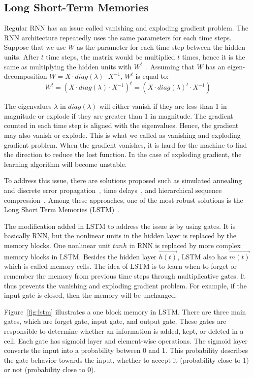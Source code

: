 \subsection{Long Short-Term Memories}
Regular RNN has an issue called vanishing and exploding gradient problem. The RNN architecture repeatedly uses the same parameters for each time steps. Suppose that we use $W$ as the parameter for each time step between the hidden units. After $t$ time steps, the matrix would be multiplied $t$ times, hence it is the same as multiplying the hidden units with $W^{t}$~\citep{Goodfellow-et-al-2016-Book}. Assuming that $W$ has an eigen-decomposition $W = X \cdot diag(\lambda) \cdot X^{-1}$, $W^{t}$ is equal to:
\begin{equation}
W^{t} = (X \cdot diag(\lambda) \cdot X^{-1})^{t} = (X \cdot diag(\lambda)^{t} \cdot X^{-1})
\end{equation}

The eigenvalues $\lambda$ in $diag(\lambda)$ will either vanish if they are less than 1 in magnitude or explode if they are greater than 1 in magnitude. The gradient counted in each time step is aligned with the eigenvalues. Hence, the gradient may also vanish or explode. This is what we called as vanishing and exploding gradient problem. When the gradient vanishes, it is hard for the machine to find the direction to reduce the lost function. In the case of exploding gradient, the learning algorithm will become unstable.

To address this issue, there are solutions proposed such as simulated annealing and discrete error propagation~\citep{bengio1994learning}, time delays~\citep{lang1990time}, and hierarchical sequence compression~\citep{schmidhuber2007training}. Among these approaches, one of the most robust solutions is the Long Short Term Memories (LSTM)~\citep{hochreiter1997long}. 

The modification added in LSTM to address the issue is by using gates. It is basically RNN, but the nonlinear units in the hidden layer is replaced by the memory blocks. One nonlinear unit $tanh$ in RNN is replaced by more complex memory blocks in LSTM. Besides the hidden layer $\vec{h(t)}$, LSTM also has $\vec{m(t)}$ which is called memory cells.  The idea of LSTM is to learn when to forget or remember the memory from previous time steps through multiplicative gates. It thus prevents the vanishing and exploding gradient problem. For example, if the input gate is closed, then the memory will be unchanged.

Figure~\ref{fig:lstm} illustrates a one block memory in LSTM. There are three main gates, which are forget gate, input gate, and output gate. These gates are responsible to determine whether an information is added, kept, or deleted in a cell. Each gate has sigmoid layer and element-wise operations. The sigmoid layer converts the input into a probability between 0 and 1. This probability describes the gate behavior towards the input, whether to accept it (probability close to 1) or not (probability close to 0). 

